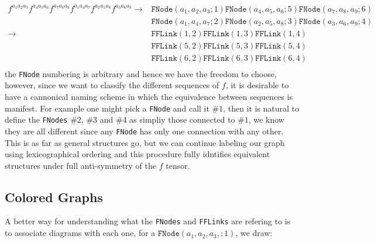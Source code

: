 \documentclass[a4paper]{article}
\begin{document}
\begin{equation}
\begin{aligned}
 f^{a_1a_2a_3}f^{a_4a_5a_6}f^{a_7a_8a_9}f^{a_1a_4a_7}f^{a_2a_5a_8}f^{a_3a_6a_9}
 \rightarrow
 &\texttt{FNode}(a_1,a_2,a_3;1)\texttt{FNode}(a_4,a_5,a_6;5)\texttt{FNode}(a_7,a_8,a_9;6)\\
 &\texttt{FNode}(a_1,a_4,a_7;2)\texttt{FNode}(a_2,a_5,a_8;3)\texttt{FNode}(a_3,a_6,a_9;4)\\
 \rightarrow
 &\texttt{FFLink}(1,2)\texttt{FFLink}(1,3)\texttt{FFLink}(1,4)\\
 &\texttt{FFLink}(5,2)\texttt{FFLink}(5,3)\texttt{FFLink}(5,4)\\
 &\texttt{FFLink}(6,2)\texttt{FFLink}(6,3)\texttt{FFLink}(6,4)\\
 \end{aligned}
\end{equation}
the \texttt{FNode} numbering is arbitrary and hence we have the freedom to choose, however, 
since we want to classify the different sequences of $f$, it is desirable to have a cannonical 
naming scheme in which the equivalence between sequences is manifest. For example one might pick a 
\texttt{FNode} and call it $\#1$, then it is natural to define the \texttt{FNodes} $\#2$, $\#3$ and $\#4$ as simpliy those connected to $\#1$, we know they are all different since any \texttt{FNode} has only 
one connection with any other. This is as far as general structures go, but we can continue labeling our 
graph using lexicographical ordering and this procedure fully idntifies equivalent structures under full
anti-symmetry of the $f$ tensor. 

\subsection{Colored Graphs}
A better way for understanding what the \texttt{FNodes} and \texttt{FFLinks} are refering to is to 
associate diagrams with each one, for a $\texttt{FNode}(a_1,a_2,a_3,;1)$, we draw:
\end{document}
